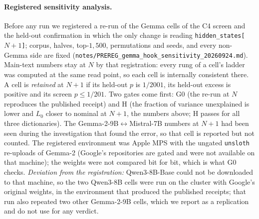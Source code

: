 \paragraph{Registered sensitivity analysis.} Before any run we registered a re-run of the Gemma cells
of the C4 screen and the held-out confirmation in which the only change is reading
\texttt{hidden\_states[$N{+}1$]}; corpus, halves, top-$1{,}500$, permutations and seeds, and every
non-Gemma side are fixed (\texttt{notes/PREREG\_gemma\_hook\_sensitivity\_20260924.md}). Main-text
numbers stay at $N$ by that registration: every rung of a cell's ladder was computed at the same read
point, so each cell is internally consistent there. A cell is \emph{retained} at $N{+}1$ if its
held-out $p$ is $1/2001$, its held-out excess is positive and its screen $p\le1/201$. Two gates come
first: G0 (the re-run at $N$ reproduces the published receipt) and H (the fraction of variance
unexplained is lower and $L_0$ closer to nominal at $N{+}1$, the numbers above; H passes for all three
dictionaries). The Gemma-2-9B$\leftrightarrow$Mistral-7B numbers at $N{+}1$ had been seen during the
investigation that found the error, so that cell is reported but not counted. The registered
environment was Apple MPS with the ungated \texttt{unsloth} re-uploads of Gemma-2 (Google's repositories
are gated and were not available on that machine); the weights were not compared bit for bit, which is
what G0 checks. \emph{Deviation from the registration:} Qwen3-8B-Base could not be downloaded to that
machine, so the two Qwen3-8B cells were run on the cluster with Google's original weights, in the
environment that produced the published receipts; that run also repeated two other Gemma-2-9B cells,
which we report as a replication and do not use for any verdict.

